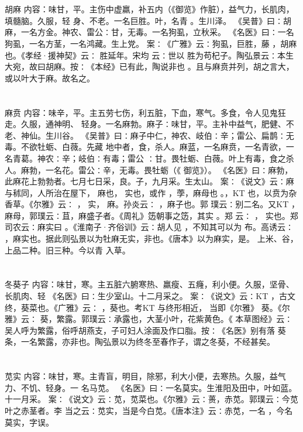 \documentclass[12pt,UTF8]{ctexbook}
\begin{document}
\chapter{}胡麻
内容：味甘，平。主伤中虚羸，补五内（《御览》作脏），益气力，长肌肉，填髓脑。久服，轻 
身、不老。一名巨胜。叶，名青 。生川泽。 
《吴普》曰∶胡麻，一名方金。神农、雷公∶甘，无毒。一名狗虱，立秋采。 
《名医》曰∶一名狗虱，一名方茎，一名鸿藏。生上党。 
案∶《广雅》云∶狗虱，巨胜，藤 ，胡麻也。《孝经·援神契》云∶ 胜延年。宋均 
云∶世以 胜为苟杞子。陶弘景云∶本生大宛，故曰胡麻。按∶《本经》已有此，陶说非也 
。且与麻贲并列，胡之言大，或以叶大于麻。故名之。 


\chapter{}麻贲
内容：味辛，平。主五劳七伤，利五脏，下血，寒气。多食，令人见鬼狂走。久服，通神明、 
轻身。一名麻勃。麻子∶味甘，平。主补中益气，肥健、不老、神仙。生川谷。 
《吴普》曰∶麻子中仁，神农、岐伯∶辛；雷公、扁鹊∶无毒。不欲牡蛎、白薇。先藏 
地中者，食，杀人。麻蓝，一名麻贲，一名青欲，一名青葛。神农∶辛；岐伯∶有毒；雷公 
∶甘。畏牡蛎、白薇。叶上有毒，食之杀人。麻勃，一名花。雷公∶辛，无毒。畏牡蛎（《 
御览》）。 
《名医》曰∶麻勃，此麻花上勃勃者。七月七日采，良。子，九月采。生太山。 
案∶《说文》云∶麻与秫同，人所治在屋下， 麻也， 实也，或作 ，荸，麻母也 
。，KT 也，以贲为杂 香草。《尔雅》云∶ ， 实， 麻。孙炎云∶ ，麻子也。郭 
璞云∶别二名。又KT ，麻母，郭璞云∶苴，麻盛子者。《周礼》笾朝事之笾，其实 。郑 
云∶ ， 实也。郑司农云∶麻实曰 。《淮南子·齐俗训》云∶胡人见 ，不知其可以为 
布。高诱云∶ ，麻实也。据此则弘景以为牡麻无实，非也。《唐本》以为麻实，是。 
上米、谷，上品二种。旧三种。今以青 入草。 


\chapter{}冬葵子
内容：味甘，寒。主五脏六腑寒热、羸瘦、五癃，利小便。久服，坚骨、长肌肉、轻 
《名医》曰∶生少室山。十二月采之。 
案∶《说文》云∶KT ，古文终，葵菜也。《广雅》云∶ ，葵也。考KT 与终形相近， 
当即《尔雅》 葵。《尔雅》云∶ 葵，繁露。郭璞云∶承露也，大茎小叶，花紫黄色。《 
本草图经》云∶吴人呼为繁露，俗呼胡燕支，子可妇人涂面及作口脂。按∶《名医》别有落 
葵条，一名繁露，亦非也。陶弘景以为终冬至春作子，谓之冬葵，不经甚矣。 


\chapter{}苋实
内容：味甘，寒。主青盲，明目，除邪，利大小便，去寒热。久服，益气力、不饥、轻身。一 
名马苋。 
《名医》曰∶一名莫实。生淮阳及田中，叶如蓝。十一月采。 
案∶《说文》云∶苋，苋菜也。《尔雅》云∶蒉，赤苋。郭璞云∶今苋叶之赤茎者。李 
当之云∶苋实，当是今白苋。《唐本注》云∶赤苋，一名 ，今名莫实，字误。 
\end{document}
